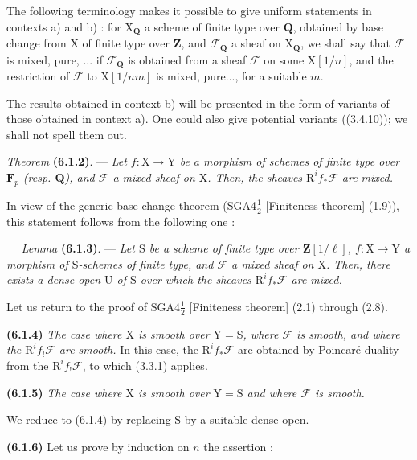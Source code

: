 \documentclass[11pt,leqno]{article}
\newcommand{\Page}[1]{\ifvmode\noindent\else\unskip\ \fi{\footnotesize\textcolor{gray}{[p.\,#1]}}\ \ignorespaces}
\begin{document}
The following terminology makes it possible to give uniform statements in
contexts a) and b) : for \(\mathrm{X}_{\mathbf{Q}}\) a scheme
of finite type over \(\mathbf{Q}\), obtained by base change from
\(\mathrm{X}\) of finite type over \(\mathbf{Z}\), and
\(\mathscr{F}_{\mathbf{Q}}\) a sheaf on \(\mathrm{X}_{\mathbf{Q}}\),
we shall say that \(\mathscr{F}\) is mixed, pure, ... if
\(\mathscr{F}_{\mathbf{Q}}\) is obtained from a sheaf \(\mathscr{F}\)
on some \(\mathrm{X}[1/n]\), and the restriction of \(\mathscr{F}\)
to \(\mathrm{X}[1/nm]\) is mixed, pure..., for a suitable \(m\).

The results obtained in context b) will be presented in the
form of variants of those obtained in context a). One could
also give potential variants ((3.4.10)); we shall not
spell them out.

\textit{Theorem} \textbf{(6.1.2)}. — \textit{Let
\(f:\mathrm{X}\to\mathrm{Y}\) be a morphism of schemes of finite type
over \(\mathbf{F}_p\) (resp. \(\mathbf{Q}\)), and \(\mathscr{F}\) a
mixed sheaf on \(\mathrm{X}\). Then, the sheaves
\(\mathrm{R}^if_*\mathscr{F}\) are mixed.}

In view of the generic base change theorem
(SGA4\(\frac{1}{2}\) [Finiteness theorem] (1.9)), this statement follows from the
following one :

\Page{244}
\textit{Lemma} \textbf{(6.1.3)}. — \textit{Let \(\mathrm{S}\)
be a scheme of finite type over \(\mathbf{Z}[1/\ell]\),
\(f:\mathrm{X}\to\mathrm{Y}\) a morphism of \(\mathrm{S}\)-schemes
of finite type, and \(\mathscr{F}\) a mixed sheaf on \(\mathrm{X}\).
Then, there exists a dense open \(\mathrm{U}\) of \(\mathrm{S}\)
over which the sheaves \(\mathrm{R}^if_*\mathscr{F}\) are
mixed.}

Let us return to the proof of SGA4\(\frac{1}{2}\) [Finiteness theorem]
(2.1) through (2.8).

\textbf{(6.1.4)} \textit{The case where \(\mathrm{X}\) is smooth over
\(\mathrm{Y}=\mathrm{S}\), where \(\mathscr{F}\) is smooth, and where the
\(\mathrm{R}^if_!\mathscr{F}\) are smooth.} In this case, the
\(\mathrm{R}^if_*\mathscr{F}\) are obtained by Poincaré duality
from the \(\mathrm{R}^if_!\mathscr{F}\), to which (3.3.1) applies.

\textbf{(6.1.5)} \textit{The case where \(\mathrm{X}\) is smooth over
\(\mathrm{Y}=\mathrm{S}\) and where \(\mathscr{F}\) is smooth.}

We reduce to (6.1.4) by replacing \(\mathrm{S}\) by a suitable
dense open.

\textbf{(6.1.6)} Let us prove by induction on \(n\) the assertion :
\end{document}
